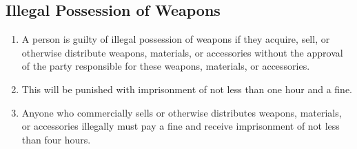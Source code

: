 \documentclass{article}
\begin{document}
\subsection{Illegal Possession of Weapons}
\begin{enumerate}[(1)]
    \item A person is guilty of illegal possession of weapons if they acquire, sell, or otherwise distribute weapons, materials, or accessories without the approval of the party responsible for these weapons, materials, or accessories.
    \item This will be punished with imprisonment of not less than one hour and a fine.
    \item Anyone who commercially sells or otherwise distributes weapons, materials, or accessories illegally must pay a fine and receive imprisonment of not less than four hours.
\end{enumerate}
\end{document}
